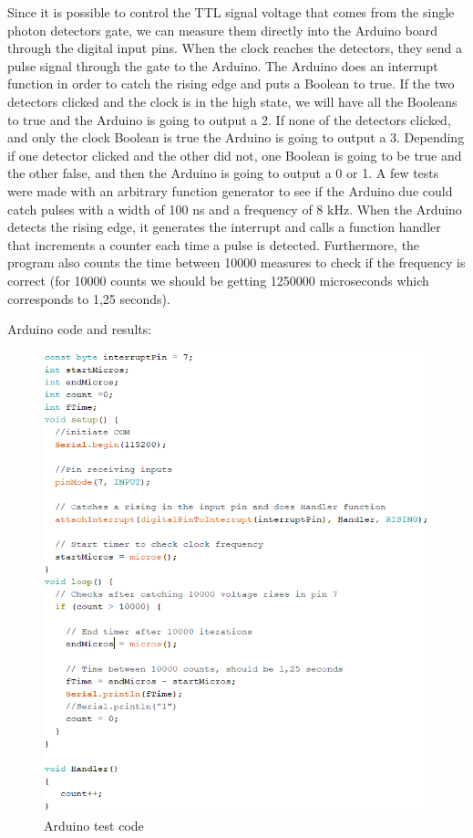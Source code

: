 \begin{refsection}
Since it is possible to control the TTL signal voltage that comes from the single photon detectors gate, we can measure them directly into the Arduino board through the digital input pins. When the clock reaches the detectors, they send a pulse signal through the gate to the Arduino. The Arduino does an interrupt function in order to catch the rising edge and puts a Boolean to true. If the two detectors clicked and the clock is in the high state, we will have all the Booleans to true and the Arduino is going to output a 2. If none of the detectors clicked, and only the clock Boolean is true the Arduino is going to output a 3. Depending if one detector clicked and the other did not, one Boolean is going to be true and the other false, and then the Arduino is going to output a 0 or 1.
A few tests were made with an arbitrary function generator to see if the Arduino due could catch pulses with a width of 100 ns and a frequency of 8 kHz. When the Arduino detects the rising edge, it generates the interrupt and calls a function handler that increments a counter each time a pulse is detected. Furthermore, the program also counts the time between 10000 measures to check if the frequency is correct (for 10000 counts we should be getting 1250000 microseconds which corresponds to 1,25 seconds).


\clearpage

Arduino code and results:

\begin{figure}[H]
	\centering
	\includegraphics[width=0.85\linewidth]{./sdf/arduino_quantum_rx/figures/arduinoTest.PNG}
	\caption{Arduino test code}
	\label{montage}
\end{figure}


\end{refsection}
